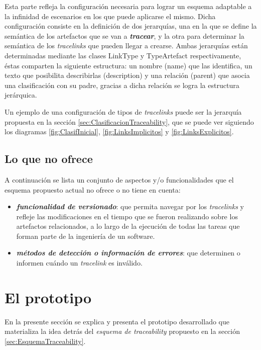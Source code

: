 \documentclass[a4paper,12pt,oneside,spanish]{book}
\begin{document}
Esta parte refleja la configuración necesaria para lograr un esquema adaptable a la infinidad de escenarios en los que puede aplicarse el mismo. Dicha configuración consiste en la definición de dos jerarquías, una en la que se define la semántica de los artefactos que se van a \textit{\textbf{tracear}}, y la otra para determinar la semántica de los \textit{tracelinks} que pueden llegar a crearse. Ambas jerarquías están determinadas mediante las clases \textsf{LinkType} y \textsf{TypeArtefact} respectivamente, éstas comparten la siguiente estructura: un nombre (\textsf{name}) que las identifica, un texto que posibilita describirlas (\textsf{description}) y una relación (\textsf{parent}) que asocia una clasificación con su padre, gracias a dicha relación se logra la estructura jerárquica.

Un ejemplo de una configuración de tipos de \textit{tracelinks} puede ser la jerarquía propuesta en la sección \ref{sec:ClasificacionTraceability}, que se puede ver siguiendo los diagramas \ref{fig:ClasifInicial}, \ref{fig:LinksImplicitos} y \ref{fig:LinksExplicitos}.


\subsection{Lo que no ofrece}

A continuación se lista un conjunto de aspectos y/o funcionalidades que el esquema propuesto actual no ofrece o no tiene en cuenta:

\begin{itemize}

\item \textbf{\textit{funcionalidad de versionado}}: que permita navegar por los \textit{tracelinks} y refleje las modificaciones en el tiempo que se fueron realizando sobre los artefactos relacionados, a lo largo de la ejecución de todas las tareas que forman parte de la ingeniería de un software.

\item \textbf{\textit{métodos de detección o información de errores}}: que determinen o informen cuándo un \textit{tracelink} es inválido.

\end{itemize}


\section{El prototipo}

En la presente sección se explica y presenta el prototipo desarrollado que materializa la idea detrás del \textit{esquema de traceability} propuesto en la sección \ref{sec:EsquemaTraceability}.
\end{document}
